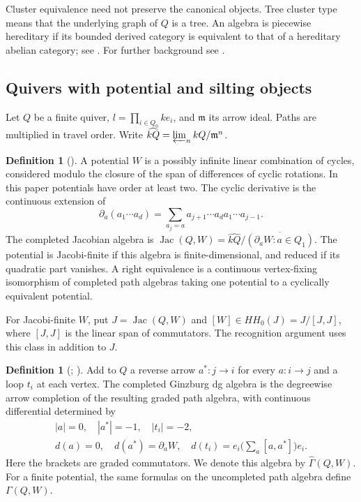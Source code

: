 \documentclass[12pt,a4paper,english,reqno]{amsart}
\theoremstyle{plain}
\theoremstyle{definition}
\newtheorem{dfn*}[thm]{Definition}
\numberwithin{equation}{section}
\def\Ga{\Gamma}
\def\Jac{\operatorname{Jac}}
\begin{document}
Cluster equivalence need not preserve the canonical objects. Tree
cluster type means that the underlying graph of $Q$ is a tree.
An algebra is piecewise hereditary if its bounded derived category
is equivalent to that of a hereditary abelian category; see
\cite[Section 6]{AOTree}. For further background see \cite{AmiotSurvey}.

\subsection{Quivers with potential and silting objects}\label{subsec:potentials}
Let $Q$ be a finite quiver, $l=\prod_{i\in Q_0}ke_i$, and
$\mathfrak m$ its arrow ideal. Paths are multiplied in travel order.
Write $\widehat{kQ}=\varprojlim_n kQ/\mathfrak m^n$.

\begin{dfn*}[{\cite[Definitions 3.1--3.2 and 4.2]{DWZ}}]\label{def:potential}
A potential $W$ is a possibly infinite linear combination of cycles,
considered modulo the closure of the span of differences of cyclic
rotations. In this paper potentials have order at least two.
The cyclic derivative is the continuous extension of
\[
 \partial_a(a_1\cdots a_d)
 =\sum_{a_j=a}a_{j+1}\cdots a_da_1\cdots a_{j-1}.
\]
The completed Jacobian algebra is
$\Jac(Q,W)=\widehat{kQ}/\overline{(\partial_aW:a\in Q_1)}$.
The potential is Jacobi-finite if this algebra is finite-dimensional,
and reduced if its quadratic part vanishes. A right equivalence is a
continuous vertex-fixing isomorphism of completed path algebras taking
one potential to a cyclically equivalent potential.
\end{dfn*}

For Jacobi-finite $W$, put $J=\Jac(Q,W)$ and
$[W]\in HH_0(J)=J/[J,J]$, where $[J,J]$ is the linear span of
commutators. The recognition argument uses this class in addition to $J$.

\begin{dfn*}[{\cite[Section 2.6]{KY}; \cite[Section 6.2]{Keller}}]\label{def:ginzburg}
Add to $Q$ a reverse arrow $a^*:j\to i$ for every $a:i\to j$ and
a loop $t_i$ at each vertex. The completed Ginzburg dg algebra is
the degreewise arrow completion of the resulting graded path algebra,
with continuous differential determined by
\[
 \begin{gathered}
 |a|=0,\quad |a^*|=-1,\quad |t_i|=-2,\\
 d(a)=0,\quad d(a^*)=\partial_aW,\quad
 d(t_i)=e_i\bigl(\sum_a[a,a^*]\bigr)e_i.
 \end{gathered}
\]
Here the brackets are graded commutators. We denote this algebra by
$\widehat\Ga(Q,W)$. For a finite potential, the same formulas on
the uncompleted path algebra define $\Ga(Q,W)$.
\end{dfn*}
\end{document}
